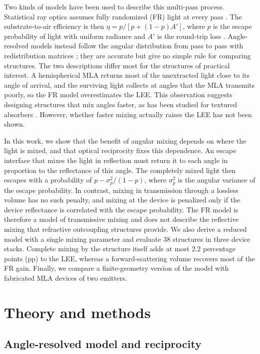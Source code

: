 \documentclass{optica-article}
\begin{document}
Two kinds of models have been used to describe this multi-pass process. Statistical ray optics assumes fully randomized (FR) light at every pass \cite{r10,r11,r12}. The substrate-to-air efficiency is then $\eta = p/[p+(1-p)A']$, where $p$ is the escape probability of light with uniform radiance and $A'$ is the round-trip loss \cite{r13}. Angle-resolved models instead follow the angular distribution from pass to pass with redistribution matrices \cite{r14,r15,r16,r17}; they are accurate but give no simple rule for comparing structures. The two descriptions differ most for the structures of practical interest. A hemispherical MLA returns most of the unextracted light close to its angle of arrival, and the surviving light collects at angles that the MLA transmits poorly, so the FR model overestimates the LEE. This observation suggests designing structures that mix angles faster, as has been studied for textured absorbers \cite{r18}. However, whether faster mixing actually raises the LEE has not been shown.

In this work, we show that the benefit of angular mixing depends on where the light is mixed, and that optical reciprocity fixes this dependence. An escape interface that mixes the light in reflection must return it to each angle in proportion to the reflectance of this angle. The completely mixed light then escapes with a probability of $p - \sigma_p^2/(1-p)$, where $\sigma_p^2$ is the angular variance of the escape probability. In contrast, mixing in transmission through a lossless volume has no such penalty, and mixing at the device is penalized only if the device reflectance is correlated with the escape probability. The FR model is therefore a model of transmissive mixing and does not describe the reflective mixing that refractive outcoupling structures provide. We also derive a reduced model with a single mixing parameter and evaluate 38 structures in three device stacks. Complete mixing by the structure itself adds at most 2.2 percentage points (pp) to the LEE, whereas a forward-scattering volume recovers most of the FR gain. Finally, we compare a finite-geometry version of the model with fabricated MLA devices of two emitters.

\section{Theory and methods}

\subsection{Angle-resolved model and reciprocity}
\end{document}
